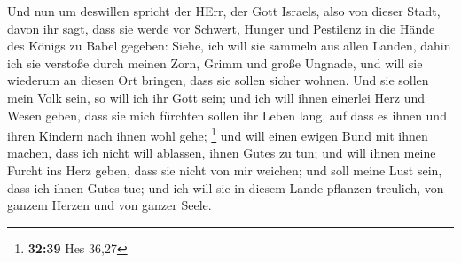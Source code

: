  Und nun um deswillen spricht der HErr, der Gott Israels,
also von dieser Stadt, davon ihr sagt, dass sie werde vor Schwert,
Hunger und Pestilenz in die Hände des Königs zu Babel gegeben:
 Siehe, ich will sie sammeln aus allen Landen, dahin ich
sie verstoße durch meinen Zorn, Grimm und große Ungnade, und will sie
wiederum an diesen Ort bringen, dass sie sollen sicher wohnen.
 Und sie sollen mein Volk sein, so will ich ihr Gott sein;
 und ich will ihnen einerlei Herz und Wesen geben, dass sie
mich fürchten sollen ihr Leben lang, auf dass es ihnen und ihren Kindern
nach ihnen wohl gehe; \footnote{\textbf{32:39} Hes 36,27} 
und will einen ewigen Bund mit ihnen machen, dass ich nicht will
ablassen, ihnen Gutes zu tun; und will ihnen meine Furcht ins Herz
geben, dass sie nicht von mir weichen;  und soll meine Lust
sein, dass ich ihnen Gutes tue; und ich will sie in diesem Lande
pflanzen treulich, von ganzem Herzen und von ganzer Seele.

